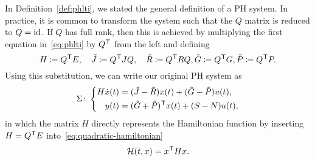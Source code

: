 \begin{remark}
    In Definition~\ref{def:phlti}, we stated the general definition of a \ac{PH} system.
    In practice, it is common to transform the system such that the $Q$ matrix is reduced to $Q = \text{id}_{}$.
    If $Q$ has full rank, then this is achieved by multiplying the first equation in~\eqref{eq:phlti} by $Q^{\mkern1mu \mathsf{T}}$ from the left and defining
    \begin{equation*}
        H \coloneqq Q^{\mkern1mu \mathsf{T}} E,\quad \tilde{J} \coloneqq Q^{\mkern1mu \mathsf{T}} J Q,\quad \tilde{R} \coloneqq Q^{\mkern1mu \mathsf{T}} R Q, \tilde{G} \coloneqq Q^{\mkern1mu \mathsf{T}} G, \tilde{P} \coloneqq Q^{\mkern1mu \mathsf{T}} P.
    \end{equation*}
    Using this substitution, we can write our original \ac{PH} system as
    \begin{equation*}
        \Sigma \colon \left\lbrace
        \begin{aligned}
            H \dot{x}(t) &= (\tilde{J} - \tilde{R}) x(t) + (\tilde{G} - \tilde{P}) u(t), \\
            y(t) &= (\tilde{G} + \tilde{P})^{\mkern1mu \mathsf{T}} x(t) + (S - N) u(t),
        \end{aligned}
        \right.
    \end{equation*}
    in which the matrix $H$ directly represents the Hamiltonian function by inserting $H = Q^{\mkern1mu \mathsf{T}} E$ into~\eqref{eq:quadratic-hamiltonian}
    \begin{equation*}
        \mathcal{H}(t, x) = x^{\mkern1mu \mathsf{T}} H x.
    \end{equation*}
\end{remark}

